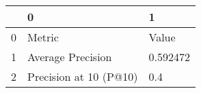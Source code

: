 \begin{tabular}{lll}
\toprule
{} &                       0 &         1 \\
\midrule
0 &                  Metric &     Value \\
1 &       Average Precision &  0.592472 \\
2 &  Precision at 10 (P@10) &       0.4 \\
\bottomrule
\end{tabular}
